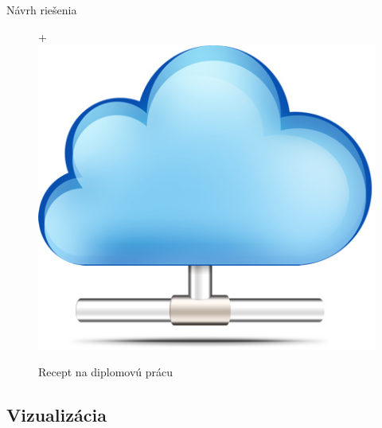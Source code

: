 \documentclass[hyperref={unicode}]{beamer}
\begin{document}
\begin{frame}{Návrh riešenia}
\begin{figure}[htp]
		{\Huge +}
		\includegraphics[align=c,height=\myGraphicsHeight]{cloud-computing}
		\caption{Recept na diplomovú prácu}
	\end{figure}
\end{frame}



\subsection{Vizualizácia}
\label{sub:Vizualizácia}
\end{document}
